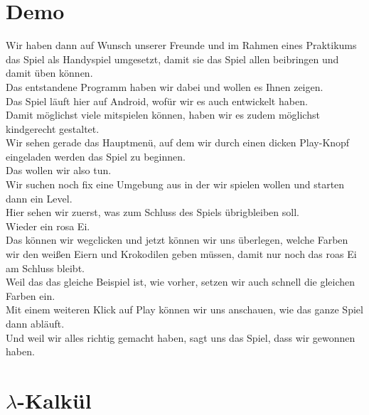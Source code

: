 \documentclass{scrartcl}
\begin{document}
	\section{Demo}
	Wir haben dann auf Wunsch unserer Freunde und im Rahmen eines Praktikums das Spiel als Handyspiel umgesetzt, damit sie das Spiel allen beibringen und damit üben können.\\
	Das entstandene Programm haben wir dabei und wollen es Ihnen zeigen.\\
	Das Spiel läuft hier auf Android, wofür wir es auch entwickelt haben.\\
	Damit möglichst viele mitspielen können, haben wir es zudem möglichst kindgerecht gestaltet.\\
	Wir sehen gerade das Hauptmenü, auf dem wir durch einen dicken Play-Knopf eingeladen werden das Spiel zu beginnen.\\
	Das wollen wir also tun.\\
	Wir suchen noch fix eine Umgebung aus in der wir spielen wollen und starten dann ein Level.\\
	Hier sehen wir zuerst, was zum Schluss des Spiels übrigbleiben soll.\\
	Wieder ein rosa Ei.\\
	Das können wir wegclicken und jetzt können wir uns überlegen, welche Farben wir den weißen Eiern und Krokodilen geben müssen, damit nur noch das roas Ei am Schluss bleibt.\\
	Weil das das gleiche Beispiel ist, wie vorher, setzen wir auch schnell die gleichen Farben ein.\\
	Mit einem weiteren Klick auf Play können wir uns anschauen, wie das ganze Spiel dann abläuft.\\
	Und weil wir alles richtig gemacht haben, sagt uns das Spiel, dass wir gewonnen haben.\\
	
	\section{$\lambda$-Kalkül}
	
	
\end{document}
